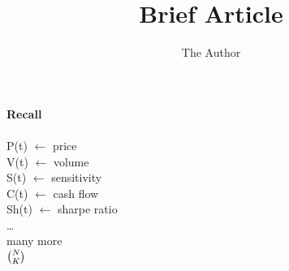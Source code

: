 \documentclass[11pt, oneside]{article}   	%
\title{Brief Article}
\author{The Author}
\begin{document}
\maketitle

 \textbf{\Large Recall}\\
 \\
     P(t)   $\leftarrow$ price\\
     V(t)   $\leftarrow$ volume\\
     S(t)   $\leftarrow$ sensitivity\\
     C(t)   $\leftarrow$ cash flow\\
     Sh(t) $\leftarrow$ sharpe ratio\\
     \ldots\\
     many more\\
  ${\Large N\choose K}$\\   
\begin{figure}[htbp]

\end{figure}
\end{document}

